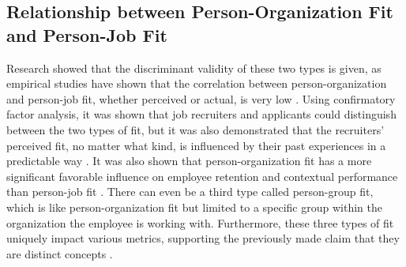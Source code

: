 \documentclass[draft,final]{thesisclass} %
\begin{document}
\subsection{Relationship between Person-Organization Fit and Person-Job Fit}
Research showed that the discriminant validity of these two types is given, as empirical studies have shown that the correlation between person-organization and person-job fit, whether perceived or actual, is very low \parencite[185]{po_and_pj_fit_literature_review}.
Using confirmatory factor analysis, it was shown that job recruiters and applicants could distinguish between the two types of fit, but it was also demonstrated that the recruiters' perceived fit, no matter what kind, is influenced by their past experiences in a predictable way \parencite[185]{po_and_pj_fit_literature_review}.
It was also shown that person-organization fit has a more significant favorable influence on employee retention and contextual performance than person-job fit \parencite[185]{po_and_pj_fit_literature_review}.
There can even be a third type called person-group fit, which is like person-organization fit but limited to a specific group within the organization the employee is working with.
Furthermore, these three types of fit uniquely impact various metrics, supporting the previously made claim that they are distinct concepts \parencite[185]{po_and_pj_fit_literature_review}.
\end{document}
